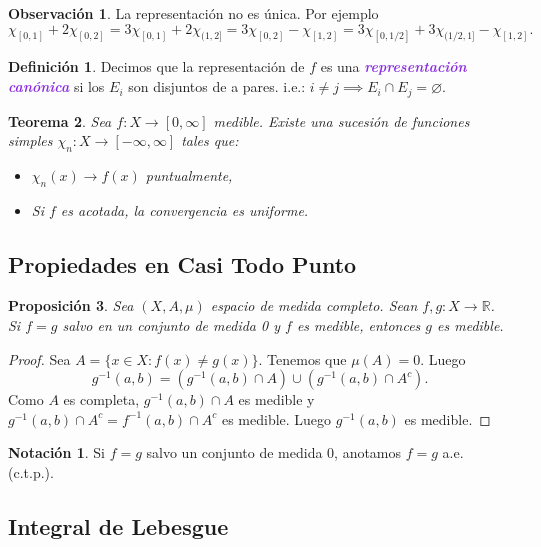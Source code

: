 \documentclass{article}
\newtheorem{theorem}{Teorema}[subsection]
\newtheorem{proposition}[theorem]{Proposición}
\theoremstyle{definition}
\newtheorem{definition}[theorem]{Definición}
\newtheorem*{notation}{Notación}
\newtheorem*{obs}{Observación}
\theoremstyle{remark}
\numberwithin{equation}{section}
\newcommand{\R}{\mathbb{R}}
\newcommand{\oo}{\infty}
\newcommand{\wea}[1]{\textcolor{BlueViolet}{\textbf{\emph{#1}}}}
\begin{document}
\begin{obs}
  La representación no es única. Por ejemplo 
  \[ \chi_{[0,1]} + 2 \chi_{[0,2]}
  = 3 \chi_{[0,1]} + 2 \chi_{(1,2]}
  = 3 \chi_{[0,2]} - \chi_{[1,2]}
  = 3 \chi_{[0,1/2]} + 3 \chi_{(1/2,1]} - \chi_{[1,2]}. \]
\end{obs}

\begin{definition}
  Decimos que la representación de $f$ es una \wea{representación canónica} si los $E_i$ son disjuntos de a pares. i.e.: $i \neq j \implies E_i \cap E_j = \varnothing$.
\end{definition}

\begin{theorem}
  Sea $f \colon X \to [0,\oo]$ medible. Existe una sucesión de funciones simples $\chi_n \colon X \to [-\oo,\oo]$ tales que:
  \begin{itemize}
    \item $\chi_n(x) \to f(x)$ puntualmente,
    \item Si $f$ es acotada, la convergencia es uniforme.
  \end{itemize}
\end{theorem}

\subsection{Propiedades en Casi Todo Punto}

\begin{proposition}
  Sea $(X,A,\mu)$ espacio de medida completo. Sean $f,g \colon X \to \R$. Si $f=g$ salvo en un conjunto de medida 0 y $f$ es medible, entonces $g$ es medible.
\end{proposition}
\begin{proof}
  Sea $A = \{x \in X \colon f(x) \neq g(x)\}$. Tenemos que $\mu(A) = 0$. Luego 
  \[ g^{-1}(a,b) = (g^{-1}(a,b) \cap A) \cup (g^{-1}(a,b) \cap A^c). \]
  Como $A$ es completa, $g^{-1}(a,b) \cap A$ es medible y $g^{-1}(a,b) \cap A^c = f^{-1}(a,b) \cap A^c$ es medible. Luego $g^{-1}(a,b)$ es medible.
\end{proof}

\begin{notation}
  Si $f = g$ salvo un conjunto de medida 0, anotamos $f=g$ a.e. (c.t.p.).
\end{notation}

\newpage
\subsection{Integral de Lebesgue}
\end{document}
